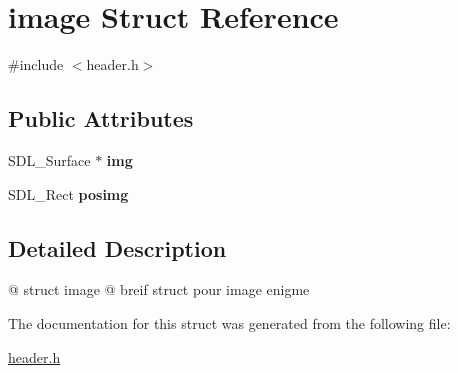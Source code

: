 \hypertarget{structimage}{}\section{image Struct Reference}
\label{structimage}


{\ttfamily \#include $<$header.\+h$>$}

\subsection*{Public Attributes}
\begin{DoxyCompactItemize}
\item 
\mbox{\label{structimage_a27c5d076eb3f7ede915b271bf8b3a695}} 
S\+D\+L\+\_\+\+Surface $\ast$ {\bfseries img}
\item 
\mbox{\label{structimage_a5015e0263f9517aa26af669cb6075042}} 
S\+D\+L\+\_\+\+Rect {\bfseries posimg}
\end{DoxyCompactItemize}


\subsection{Detailed Description}
@ struct image @ breif struct pour image enigme 

The documentation for this struct was generated from the following file\+:\begin{DoxyCompactItemize}
\item 
\hyperlink{header_8h}{header.\+h}\end{DoxyCompactItemize}
